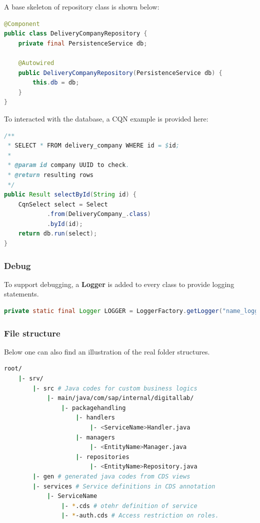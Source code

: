  A base skeleton of repository class is shown below:

\begin{lstlisting}[language={java}]
@Component
public class DeliveryCompanyRepository {
    private final PersistenceService db;

    @Autowired
    public DeliveryCompanyRepository(PersistenceService db) {
        this.db = db;
    }
}
\end{lstlisting}

To interacted with the database, a CQN example is provided here:

\begin{lstlisting}[language={java}]
/**
 * SELECT * FROM delivery_company WHERE id = $id;
 *
 * @param id company UUID to check.
 * @return resulting rows
 */
public Result selectById(String id) {
    CqnSelect select = Select
            .from(DeliveryCompany_.class)
            .byId(id);
    return db.run(select);
}
\end{lstlisting}

\subsubsection{Debug}

To support debugging, a \textbf{Logger} is added to every class to provide logging statements.

\begin{lstlisting}[language={java}]
 private static final Logger LOGGER = LoggerFactory.getLogger("name_logger");
\end{lstlisting}


\subsubsection{File structure}
Below one can also find an illustration of the real folder structures.

\begin{lstlisting}[language={bash}]
root/
    |- srv/
        |- src # Java codes for custom business logics
            |- main/java/com/sap/internal/digitallab/
                |- packagehandling
                    |- handlers
                        |- <ServiceName>Handler.java
                    |- managers
                        |- <EntityName>Manager.java
                    |- repositories
                        |- <EntityName>Repository.java
        |- gen # generated java codes from CDS views
        |- services # Service definitions in CDS annotation
            |- ServiceName 
                |- *.cds # otehr definition of service
                |- *-auth.cds # Access restriction on roles.
\end{lstlisting}

